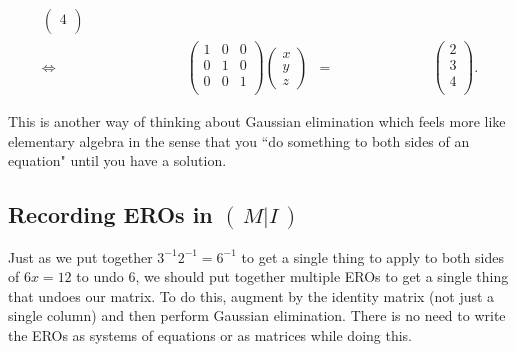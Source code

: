 \begin{example}
\begin{equation*}
\begin{array}{crcr}
\begin{pmatrix}
4\\
\end{pmatrix} 
\\[7mm]
\Leftrightarrow\ &%
\phantom{
\begin{pmatrix}
1 & 0 & 0  \\ 
0 & 1 & -1 \\
0& 0 & 1  \\
\end{pmatrix} 
}
\begin{pmatrix}
1 & 0 & 0 \\
0 & 1 & 0  \\ 
0& 0 & 1  \\
\end{pmatrix} 
\begin{pmatrix}
 x \\ 
y \\
z 
\end{pmatrix} 
&=&
\phantom{
\begin{pmatrix}
1 & 0 & 0  \\ 
0 & 1 &  -1\\
0& 0  &  1  \\
\end{pmatrix} 
}
\! 
\begin{pmatrix}
2 \\
3 \\ 
4\\
\end{pmatrix} .
\end{array}
\end{equation*}
\end{example}



\noindent
This is another way of thinking about Gaussian elimination which feels more like elementary algebra in the sense that you ``do something to both sides of an equation" until you have a solution. 



\subsection{Recording EROs in $(\!\, M | I \,) $}\label{EROinverse}
Just as we put together $3^{-1}2^{-1}=6^{-1}$ to get a single thing to apply to both sides of $6x=12$ to undo $6$, we should put together multiple EROs  to get a single thing that undoes our matrix. 
To do this, augment by the identity matrix (not just a single column) and then perform Gaussian elimination. 
There is no need to write the EROs as systems of equations or as matrices while doing this. 

